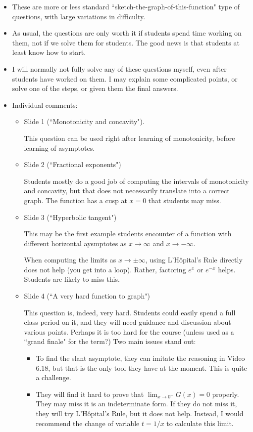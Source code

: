 \documentclass[11pt]{article}
\newcommand {\DS} [1] {${\displaystyle #1}$}
\newcommand{\nl}{\hfill \vspace{-1.1\baselineskip}} %
\begin{document}
\begin{comments}
\nl
	\begin{itemize}
		\item  These are more or less standard ``sketch-the-graph-of-this-function" type of questions, with large variations in difficulty.    
		\item As usual, the questions are only worth it if students spend time working on them, not if we solve them for students.  The good news is that students at least know how to start. 
		\item I will normally not fully solve any of these questions myself, even after students have worked on them.  I may explain some complicated points, or solve one of the steps, or given them the final answers.
		\item Individual comments:
			\begin{itemize}
				\item Slide 1 (``Monotonicity and concavity").
				
					This question can be used right after learning of monotonicity, before learning of asymptotes.
				\item  Slide 2 (``Fractional exponents")
				
					Students mostly do a good job of computing the intervals of monotonicity and concavity, but that does not necessarily translate into a correct graph.  The function has a cusp at $x=0$ that students may miss.
				\item Slide 3 (``Hyperbolic tangent")
				
					This may be the first example students encounter of a function with different horizontal aysmptotes as $x \to \infty$ and $x \to -\infty$.
					
					When computing the limits as $x \to \pm \infty$, using L'H\^opital's Rule directly does not help (you get into a loop).  Rather, factoring $e^x$ or $e^{-x}$ helps.  Students are likely to miss this.
				
					
				\item Slide 4 (``A very hard function to graph")
				
				This question is, indeed, very hard.  Students could easily spend a full class period on it, and they will need guidance and discussion about various points.    Perhaps it is too hard for the course (unless used as a ``grand finale" for the term?) Two main issues stand out:
					\begin{itemize}
						\item To find the slant asymptote, they can imitate the reasoning in Video 6.18, but that is the only tool they have at the moment.  This is quite a challenge.
						\item They will find it hard to prove that \DS{\lim_{x \to 0^-} G(x) =0} properly.  They may miss it is an indeterminate form.  If they do not miss it, they will try L'H\^{o}pital's Rule, but it does not help.  Instead, I would recommend the change of variable \DS{t=1/x} to calculate this limit.
					\end{itemize}
			\end{itemize}
	\end{itemize}
\end{comments}
\end{document}
